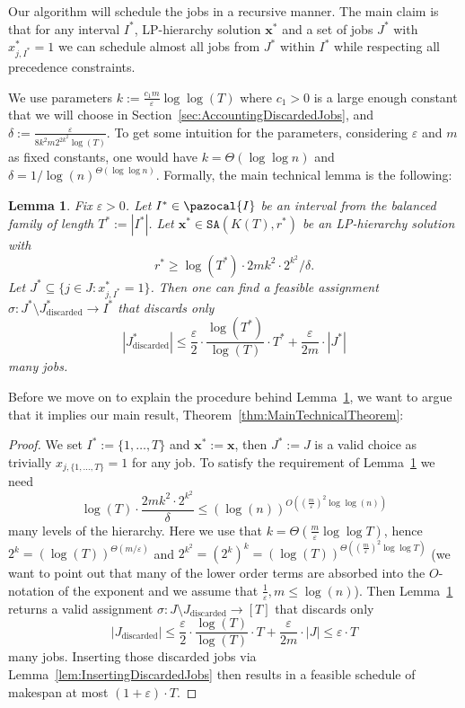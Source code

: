 \documentclass[11pt,letterpaper,oneside,english]{article}
\theoremstyle{theorem}
\newtheorem{lemma}[theorem]{Lemma}
\begin{document}
Our algorithm will schedule the jobs in  a recursive manner. The main claim is that for any interval $I^*$,  LP-hierarchy solution $\bm{x}^*$ and a set of jobs $J^*$ with $x_{j,I^*}^*=1$
we can schedule almost all jobs from $J^*$ within $I^*$ while respecting all precedence constraints. 

We use parameters $k := \frac{c_1m}{\varepsilon}\log \log (T)$ where $c_1>0$ is a large 
enough constant that we will choose 
in Section~\ref{sec:AccountingDiscardedJobs}, and $\delta := \frac{\varepsilon}{8k^2m2^{2k^2}\log(T)}$.
To get some intuition for the parameters, considering $\varepsilon$ and $m$ as fixed constants, 
one would have $k = \Theta(\log \log n)$ and $\delta = 1/\log(n)^{\Theta(\log \log n)}$.
Formally, the main technical lemma is the following: \begin{lemma} \label{lem:MainRecursiveAlgorithm}
Fix $\varepsilon>0$. Let $I^* \in \pazocal{I}$ be an interval from the balanced family of length $T^* := |I^*|$.
Let $\bm{x}^* \in \texttt{SA}(K(T),r^*)$ be an LP-hierarchy solution with 
\[
  r^* \geq \log(T^*) \cdot 2mk^2 \cdot 2^{k^2} / \delta.
\]
Let
$J^* \subseteq \{ j \in J : x_{j,I^*}^{*} = 1\}$.
Then one can find a feasible assignment $\sigma : J^* \setminus J_{\textrm{discarded}}^* \to I^*$ 
that discards only
\[
 |J_{\textrm{discarded}}^*| \leq \frac{\varepsilon}{2} \cdot \frac{\log (T^*)}{\log(T)} \cdot T^* + \frac{\varepsilon}{2m} \cdot |J^*|
\]
many jobs.
\end{lemma}


Before we move on to explain the procedure behind Lemma~\ref{lem:MainRecursiveAlgorithm}, we 
want to argue that it implies our main result, Theorem~\ref{thm:MainTechnicalTheorem}: 
\begin{proof}
We set $I^* := \{ 1,\ldots,T\}$ and $\bm{x}^{*} := \bm{x}$, then $J^* := J$ is a valid choice as trivially $x_{j,\{1,\ldots,T\}} = 1$
for any job. To satisfy the requirement of Lemma~\ref{lem:MainRecursiveAlgorithm} we need
\[
 \log(T) \cdot \frac{2mk^2 \cdot 2^{k^2}}{\delta} \leq (\log(n))^{O((\frac{m}{\varepsilon})^2 \log\log(n))}
\]
many levels of the hierarchy. Here we use that $k = \Theta(\frac{m}{\varepsilon} \log \log T)$, 
hence $2^{k} = (\log(T))^{\Theta(m/\varepsilon)}$ and $2^{k^2} = (2^k)^k = (\log(T))^{\Theta((\frac{m}{\varepsilon})^2 \log \log T)}$
(we want to point out that many of the lower order terms are absorbed into the $O$-notation
of the exponent and we assume that $\frac{1}{\varepsilon},m \leq \log(n)$).
Then Lemma~\ref{lem:MainRecursiveAlgorithm} returns a valid assignment $\sigma : J \setminus J_{\textrm{discarded}} \to [T]$ 
that discards only
\[
 |J_{\textrm{discarded}}| \leq \frac{\varepsilon}{2} \cdot \frac{\log(T)}{\log(T)} \cdot T + \frac{\varepsilon}{2m} \cdot |J|
 \leq \varepsilon \cdot T
\]
many jobs. Inserting those discarded jobs via Lemma~\ref{lem:InsertingDiscardedJobs} then
results in a feasible schedule of makespan at most  $(1+\varepsilon) \cdot T$.
\end{proof}
\end{document}
